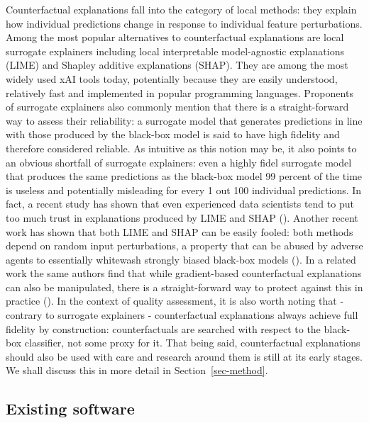 \documentclass[
  letterpaper,
  DIV=11,
  numbers=noendperiod]{scrartcl}
\begin{document}
Counterfactual explanations fall into the category of local methods:
they explain how individual predictions change in response to individual
feature perturbations. Among the most popular alternatives to
counterfactual explanations are local surrogate explainers including
local interpretable model-agnostic explanations (LIME) and Shapley
additive explanations (SHAP). They are among the most widely used xAI
tools today, potentially because they are easily understood, relatively
fast and implemented in popular programming languages. Proponents of
surrogate explainers also commonly mention that there is a
straight-forward way to assess their reliability: a surrogate model that
generates predictions in line with those produced by the black-box model
is said to have high fidelity and therefore considered reliable. As
intuitive as this notion may be, it also points to an obvious shortfall
of surrogate explainers: even a highly fidel surrogate model that
produces the same predictions as the black-box model 99 percent of the
time is useless and potentially misleading for every 1 out 100
individual predictions. In fact, a recent study has shown that even
experienced data scientists tend to put too much trust in explanations
produced by LIME and SHAP (\cite{kaur2020interpreting}). Another recent
work has shown that both LIME and SHAP can be easily fooled: both
methods depend on random input perturbations, a property that can be
abused by adverse agents to essentially whitewash strongly biased
black-box models (\cite{slack2021fooling}). In a related work the same
authors find that while gradient-based counterfactual explanations can
also be manipulated, there is a straight-forward way to protect against
this in practice (\cite{slack2021counterfactual}). In the context of
quality assessment, it is also worth noting that - contrary to surrogate
explainers - counterfactual explanations always achieve full fidelity by
construction: counterfactuals are searched with respect to the black-box
classifier, not some proxy for it. That being said, counterfactual
explanations should also be used with care and research around them is
still at its early stages. We shall discuss this in more detail in
Section~\ref{sec-method}.

\hypertarget{existing-software}{%
\subsection{Existing software}\label{existing-software}}
\end{document}
